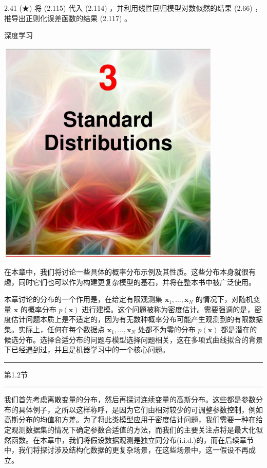 \documentclass[10pt]{article}
\newcommand{\HRule}{\begin{center}\rule{0.9\linewidth}{0.2mm}\end{center}}
\begin{document}
2.41 (★) 将 (2.115) 代入 (2.114) ，并利用线性回归模型对数似然的结果 (2.66) ，推导出正则化误差函数的结果 (2.117) 。

深度学习

\begin{center}
\includegraphics[max width=0.8\textwidth]{images/0194e279-9b28-703a-88f4-c3ac21e2010d_84_473_351_1075_1086_0.jpg}
\end{center}
\hspace*{3em} 

在本章中，我们将讨论一些具体的概率分布示例及其性质。这些分布本身就很有趣，同时它们也可以作为构建更复杂模型的基石，并将在整本书中被广泛使用。

本章讨论的分布的一个作用是，在给定有限观测集 \({\mathbf{x}}_{1},\ldots ,{\mathbf{x}}_{N}\) 的情况下，对随机变量 \(\mathbf{x}\) 的概率分布 \(p\left( \mathbf{x}\right)\) 进行建模。这个问题被称为密度估计。需要强调的是，密度估计问题本质上是不适定的，因为有无数种概率分布可能产生观测到的有限数据集。实际上，任何在每个数据点 \({\mathbf{x}}_{1},\ldots ,{\mathbf{x}}_{N}\) 处都不为零的分布 \(p\left( \mathbf{x}\right)\) 都是潜在的候选分布。选择合适分布的问题与模型选择问题相关，这在多项式曲线拟合的背景下已经遇到过，并且是机器学习中的一个核心问题。

\HRule

第1.2节

\HRule

我们首先考虑离散变量的分布，然后再探讨连续变量的高斯分布。这些都是参数分布的具体例子，之所以这样称呼，是因为它们由相对较少的可调整参数控制，例如高斯分布的均值和方差。为了将此类模型应用于密度估计问题，我们需要一种在给定观测数据集的情况下确定参数合适值的方法，而我们的主要关注点将是最大化似然函数。在本章中，我们将假设数据观测是独立同分布(i.i.d.)的，而在后续章节中，我们将探讨涉及结构化数据的更复杂场景，在这些场景中，这一假设不再成立。
\end{document}
